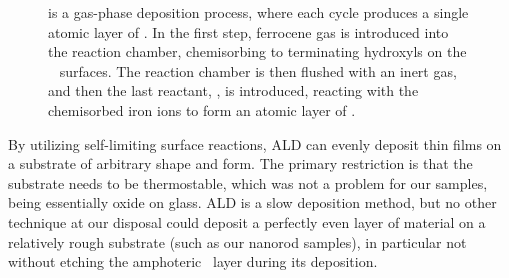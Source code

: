 \documentclass[webedition,openright,titles,swedish,english]{LuaUUThesis}\usepackage[]{graphicx}\usepackage[]{xcolor}
\begin{document}
\begin{figure}[tbp]
\centering
{}
\caption[Sketch of the atomic-layer deposition process]{%
   \protect{} is a gas-phase deposition process, where each cycle produces
   a single atomic layer of \ironox.
   In the first step, ferrocene gas is introduced into the reaction chamber, chemisorbing
   to terminating hydroxyls on the \ZnO\ \protect{} surfaces. The reaction
   chamber is then flushed with an inert gas, and then the last reactant, ,
   is introduced, reacting with the chemisorbed iron ions to form an atomic layer of \ironox.
}
\label{fig:ALD-ferrocene-process}
\end{figure}

By utilizing self-limiting surface reactions, \gls{ALD} can evenly deposit
thin films on a substrate of arbitrary shape and form.
The primary restriction is that the substrate needs to be thermostable, which was
not a problem for our samples, being essentially oxide on glass.
\Gls{ALD} is a slow deposition method, but no other technique at
our disposal could deposit a perfectly even layer
of material on a relatively rough substrate (such as our  nanorod samples),
in particular not without etching the amphoteric \zincox\ layer during
its deposition.
\end{document}

